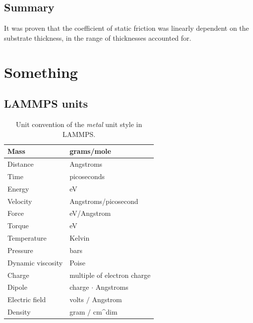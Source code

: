 \documentclass[twoside,english]{uiofysmaster}
\begin{document}
\section{Summary}


It was proven that the coefficient of static friction was linearly dependent on the substrate thickness, in the range of thicknesses accounted for. 





 





\appendix

\chapter{Something}
\section{LAMMPS units}

\begin{table}[H]
	\begin{center}
		\caption{Unit convention of the \textit{metal} unit style in LAMMPS.}
		\begin{tabularx}{0.8\textwidth}{  @{\hspace{2em}} @{}XX@{} @{\hspace{2em}} }
			\toprule
			Mass 					   & grams/mole\\ 
			\midrule
			Distance 		   		  & Angstroms\\
			\midrule
			Time 				 		& picoseconds\\
			\midrule
			Energy 			   		  & eV\\
			\midrule
			Velocity 		   		  & Angstroms/picosecond\\
			\midrule
			Force 			    	   & eV/Angstrom\\
			\midrule
			Torque 			    	  & eV\\
			\midrule
			Temperature    		  & Kelvin\\
			\midrule
			Pressure 		 		 & bars\\
			\midrule
			Dynamic viscosity & Poise\\
			\midrule
			Charge 					 & multiple of electron charge\\
			\midrule
			Dipole 					 & charge $\cdot$ Angstroms\\
			\midrule
			Electric field 		    & volts $/$ Angstrom\\
			\midrule
			Density 				& gram $/$ cm\^{}dim\\
			\bottomrule
		\end{tabularx}
		\label{tab:unitsMetal}
	\end{center}
\end{table}
\end{document}

